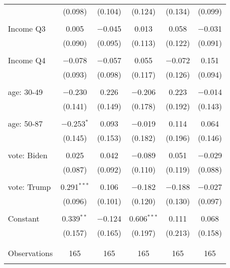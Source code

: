 \begin{tabular}{@{\extracolsep{5pt}}lccccc}
  & (0.098) & (0.104) & (0.124) & (0.134) & (0.099) \\ 
  & & & & & \\ 
 Income Q3 & 0.005 & $-$0.045 & 0.013 & 0.058 & $-$0.031 \\ 
  & (0.090) & (0.095) & (0.113) & (0.122) & (0.091) \\ 
  & & & & & \\ 
 Income Q4 & $-$0.078 & $-$0.057 & 0.055 & $-$0.072 & 0.151 \\ 
  & (0.093) & (0.098) & (0.117) & (0.126) & (0.094) \\ 
  & & & & & \\ 
 age: 30-49 & $-$0.230 & 0.226 & $-$0.206 & 0.223 & $-$0.014 \\ 
  & (0.141) & (0.149) & (0.178) & (0.192) & (0.143) \\ 
  & & & & & \\ 
 age: 50-87 & $-$0.253$^{*}$ & 0.093 & $-$0.019 & 0.114 & 0.064 \\ 
  & (0.145) & (0.153) & (0.182) & (0.196) & (0.146) \\ 
  & & & & & \\ 
 vote: Biden & 0.025 & 0.042 & $-$0.089 & 0.051 & $-$0.029 \\ 
  & (0.087) & (0.092) & (0.110) & (0.119) & (0.088) \\ 
  & & & & & \\ 
 vote: Trump & 0.291$^{***}$ & 0.106 & $-$0.182 & $-$0.188 & $-$0.027 \\ 
  & (0.096) & (0.101) & (0.120) & (0.130) & (0.097) \\ 
  & & & & & \\ 
 Constant & 0.339$^{**}$ & $-$0.124 & 0.606$^{***}$ & 0.111 & 0.068 \\ 
  & (0.157) & (0.165) & (0.197) & (0.213) & (0.158) \\ 
  & & & & & \\ 
\hline \\[-1.8ex] 

Observations & 165 & 165 & 165 & 165 & 165 \\ 
\hline 
\hline \\[-1.8ex] 
\end{tabular} 